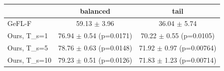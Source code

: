 \begin{tabular}{lcc}
\toprule
 & balanced & tail \\
\midrule
GeFL-F & 59.13 $\pm$ 3.96 & 36.04 $\pm$ 5.74 \\
Ours, T\_s=1 & 76.94 $\pm$ 0.54 (p=0.0171) & 70.22 $\pm$ 0.55 (p=0.0105) \\
Ours, T\_s=5 & 78.76 $\pm$ 0.63 (p=0.0148) & 71.92 $\pm$ 0.97 (p=0.00764) \\
Ours, T\_s=10 & 79.23 $\pm$ 0.51 (p=0.0126) & 71.83 $\pm$ 1.23 (p=0.00714) \\
\bottomrule
\end{tabular}
